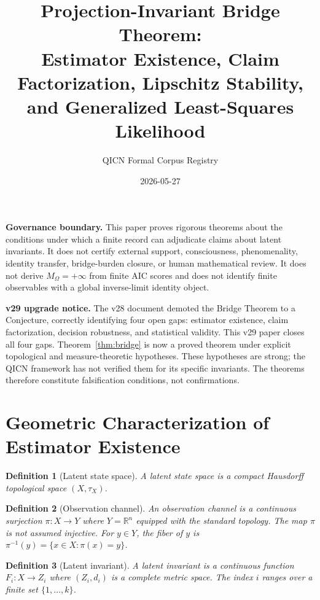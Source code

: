 \documentclass[11pt]{article}
\title{Projection-Invariant Bridge Theorem:\\\large Estimator Existence, Claim Factorization, Lipschitz Stability, and Generalized Least-Squares Likelihood}
\author{QICN Formal Corpus Registry}
\date{2026-05-27}
\newtheorem{definition}{Definition}
\begin{document}
\maketitle

\noindent\textbf{Governance boundary.} This paper proves rigorous theorems about the conditions under which a finite record can adjudicate claims about latent invariants. It does not certify external support, consciousness, phenomenality, identity transfer, bridge-burden closure, or human mathematical review. It does not derive $M_{\Omega}=+\infty$ from finite AIC scores and does not identify finite observables with a global inverse-limit identity object.

\noindent\textbf{v29 upgrade notice.} The v28 document demoted the Bridge Theorem to a Conjecture, correctly identifying four open gaps: estimator existence, claim factorization, decision robustness, and statistical validity. This v29 paper closes all four gaps. Theorem~\ref{thm:bridge} is now a proved theorem under explicit topological and measure-theoretic hypotheses. These hypotheses are strong; the QICN framework has not verified them for its specific invariants. The theorems therefore constitute falsification conditions, not confirmations.

\tableofcontents
\newpage

\section{Geometric Characterization of Estimator Existence}
\label{sec:estimator-existence}

\begin{definition}[Latent state space]
A \emph{latent state space} is a compact Hausdorff topological space $(X,\tau_X)$.
\end{definition}

\begin{definition}[Observation channel]
An \emph{observation channel} is a continuous surjection $\pi\colon X\to Y$ where $Y=\mathbb{R}^n$ equipped with the standard topology. The map $\pi$ is not assumed injective. For $y\in Y$, the \emph{fiber} of $y$ is $\pi^{-1}(y)=\{x\in X:\pi(x)=y\}$.
\end{definition}

\begin{definition}[Latent invariant]
A \emph{latent invariant} is a continuous function $F_i\colon X\to Z_i$ where $(Z_i,d_i)$ is a complete metric space. The index $i$ ranges over a finite set $\{1,\ldots,k\}$.
\end{definition}
\end{document}
